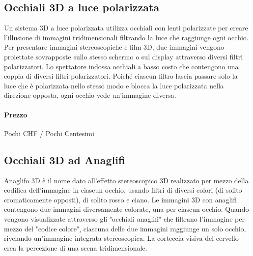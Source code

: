 \documentclass[8pt]{extarticle}
\begin{document}
\begin{multicols}{3}
\subsection{Occhiali 3D a luce polarizzata}
Un sistema 3D a luce polarizzata utilizza occhiali con lenti polarizzate per creare l'illusione di immagini
tridimensionali filtrando la luce che raggiunge ogni occhio. Per presentare immagini stereoscopiche e film 3D,
due immagini vengono proiettate sovrapposte sullo stesso schermo o sul display attraverso diversi filtri polarizzatori.
Lo spettatore indossa occhiali a basso costo che contengono una coppia di diversi filtri polarizzatori.
Poiché ciascun filtro lascia passare solo la luce che è polarizzata nello stesso modo e blocca la luce polarizzata 
nella direzione opposta, ogni occhio vede un'immagine diversa. 

\paragraph{Prezzo} Pochi CHF / Pochi Centesimi

\subsection{Occhiali 3D ad Anaglifi}
Anaglifo 3D è il nome dato all'effetto stereoscopico 3D realizzato per mezzo della codifica dell'immagine in 
ciascun occhio, usando filtri di diversi colori (di solito cromaticamente opposti), 
di solito rosso e ciano. Le immagini 3D con anaglifi contengono due immagini diversamente colorate, 
una per ciascun occhio. Quando vengono visualizzate attraverso gli "occhiali anaglifi" che filtrano 
l'immagine per mezzo del "codice colore", ciascuna delle due immagini raggiunge un solo occhio, rivelando un'immagine 
integrata stereoscopica. La corteccia visiva del cervello crea la percezione di una scena tridimensionale. 



\end{multicols}
\end{document}
